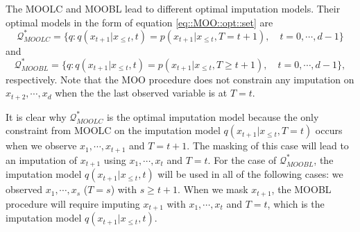 \documentclass[aos, preprint]{imsart}
\theoremstyle{plain}
\theoremstyle{definition}
\begin{document}
%




The MOOLC and MOOBL lead to different optimal imputation models. 
Their optimal models in the form of equation \eqref{eq::MOO::opt::set} are
\begin{equation}
\mathcal{Q}^*_{MOOLC} =\{q: q(x_{t+1}|x_{\leq t}, t) = p(x_{t+1}|x_{\leq t},T=t+1), \quad t=0,\cdots, d-1\}
\label{eq::MOOLC::opt::set}
\end{equation}
and 
\begin{equation}
\mathcal{Q}^*_{MOOBL} =\{q: q(x_{t+1}|x_{\leq t}, t) = p(x_{t+1}|x_{\leq t},T\geq t+1), \quad t=0,\cdots, d-1\},
\label{eq::MOOBL::opt::set}
\end{equation}
respectively.
Note that the MOO procedure does not constrain any imputation on $x_{t+2},\cdots, x_d$
when the the last observed variable is at $T=t$.

It is clear why $\mathcal{Q}^*_{MOOLC}$ is the optimal imputation model
because the only constraint from MOOLC on the imputation model $q(x_{t+1}|x_{\leq t},T=t)$ 
occurs when we observe $x_1,\cdots, x_{t+1}$ and $T=t+1$. The masking of this case will lead to 
an imputation of $x_{t+1}$ using  $x_1,\cdots, x_t$  and $T=t$.
For the case of $\mathcal{Q}^*_{MOOBL}$, the imputation model $q(x_{t+1}|x_{\leq t}, t)$
will be used in all of the following cases:
we observed $x_1,\cdots, x_s$ ($T=s$) with $s\geq t+1$. 
When we mask  $x_{t+1}$, the MOOBL procedure will require imputing $x_{t+1}$ with $x_1,\cdots, x_t$ and $T=t$,
which is the imputation model $q(x_{t+1}|x_{\leq t}, t)$.



\end{document}
